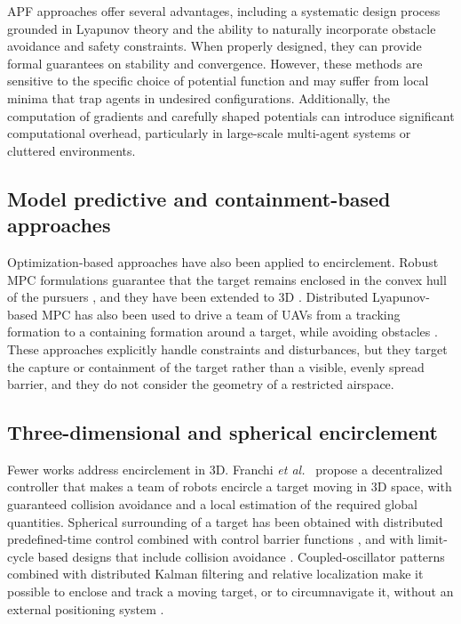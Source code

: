 \gls{APF} approaches offer several advantages, including a systematic design process grounded in Lyapunov theory and the ability to naturally incorporate obstacle avoidance and safety constraints. When properly designed, they can provide formal guarantees on stability and convergence. However, these methods are sensitive to the specific choice of potential function and may suffer from local minima that trap agents in undesired configurations. Additionally, the computation of gradients and carefully shaped potentials can introduce significant computational overhead, particularly in large-scale multi-agent systems or cluttered environments.

\subsection{Model predictive and containment-based approaches} \label{subsec.2:MPC encirclement}

Optimization-based approaches have also been applied to encirclement. Robust \gls{MPC} formulations guarantee that the target remains enclosed in the convex hull of the pursuers \cite{Wang_2021,2D_encirclement_guaranteed_sectors}, and they have been extended to \gls{3D} \cite{Patra2025}. Distributed Lyapunov-based \gls{MPC} has also been used to drive a team of \glspl{UAV} from a tracking formation to a containing formation around a target, while avoiding obstacles \cite{du2024}. These approaches explicitly handle constraints and disturbances, but they target the capture or containment of the target rather than a visible, evenly spread barrier, and they do not consider the geometry of a restricted airspace.

\subsection{Three-dimensional and spherical encirclement} \label{subsec.2:3D encirclement}

Fewer works address encirclement in \gls{3D}. Franchi \emph{et al.}~\cite{franchi2016} propose a decentralized controller that makes a team of robots encircle a target moving in \gls{3D} space, with guaranteed collision avoidance and a local estimation of the required global quantities. Spherical surrounding of a target has been obtained with distributed predefined-time control combined with control barrier functions \cite{huang2025}, and with limit-cycle based designs that include collision avoidance \cite{bo2023}. Coupled-oscillator patterns combined with distributed Kalman filtering and relative localization make it possible to enclose and track a moving target, or to circumnavigate it, without an external positioning system \cite{liu2025enclose,liu2025circ}.


